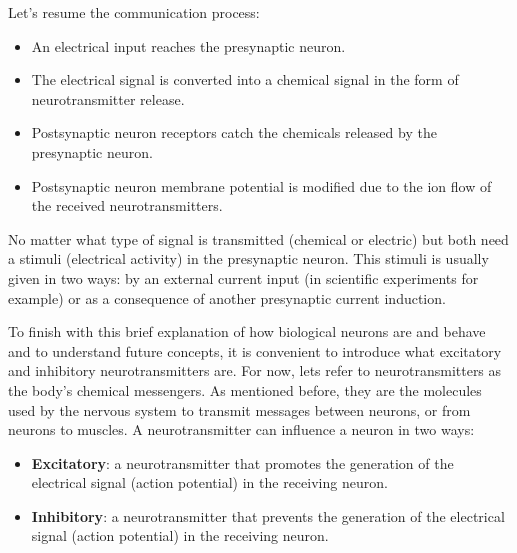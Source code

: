 \documentclass{article} %
\begin{document}
Let's resume the communication process:
\begin{itemize}
    \item An electrical input reaches the presynaptic neuron.
    
    \item The electrical signal is converted into a chemical signal in the form of neurotransmitter release.
    
    \item Postsynaptic neuron receptors catch the chemicals released by the presynaptic neuron.
    
    \item Postsynaptic neuron membrane potential is modified due to the ion flow of the received neurotransmitters.
\end{itemize}

No matter what type of signal is transmitted (chemical or electric) but both need a stimuli (electrical activity) in the presynaptic neuron. This stimuli is usually given in two ways: by an external current input (in scientific experiments for example) or as a consequence of another presynaptic current induction. 

To finish with this brief explanation of how biological neurons are and behave and to understand future concepts, it is convenient to introduce what excitatory and inhibitory neurotransmitters are. For now, lets refer to neurotransmitters as the body's chemical messengers. As mentioned before, they are the molecules used by the nervous system to transmit messages between neurons, or from neurons to muscles. A neurotransmitter can  influence a neuron in two ways:
\begin{itemize}
    \item \textbf{Excitatory}: a neurotransmitter that promotes the generation of the electrical signal (action potential) in the receiving neuron.
   
    \item \textbf{Inhibitory}: a neurotransmitter that prevents the generation of the electrical signal (action potential) in the receiving neuron.
    
\end{itemize}
\end{document}
